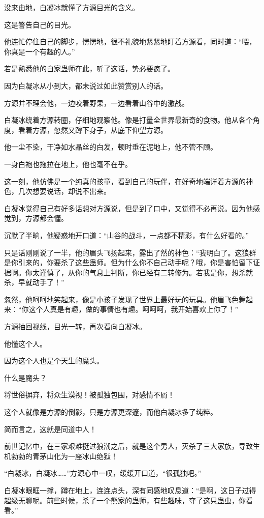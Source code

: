 \begin{this_body}
没来由地，白凝冰就懂了方源目光的含义。

这是警告自己的目光。

他连忙停住自己的脚步，愣愣地，很不礼貌地紧紧地盯着方源看，同时道：“喂，你真是一个有趣的人。”

若是熟悉他的白家蛊师在此，听了这话，势必要疯了。

因为白凝冰从小到大，都未说过如此赞赏别人的话。

方源并不理会他，一边咬着野果，一边看着山谷中的激战。

白凝冰绕着方源转圈，仔细地观察他。像是打量全世界最新奇的食物。他从各个角度，看着方源，忽然又蹲下身子，从底下仰望方源。

他一尘不染，干净如水晶丝的白发，顿时垂在泥地上，他不管不顾。

一身白袍也拖拉在地上，他也毫不在乎。

这一刻，他仿佛是一个纯真的孩童，看到自己的玩伴，在好奇地端详着方源的神色，几次想要说话，却说不出来。

白凝冰觉得自己有好多话想对方源说，但是到了口中，又觉得不必再说。因为他感觉到，方源都会懂。

沉默了半晌，他疑惑地开口道：“山谷的战斗，一点都不精彩，有什么好看的。”

只是话刚刚说了一半，他的眉头飞扬起来，露出了然的神色：“我明白了。这狼群是你引来的，你要杀了这些蛊师。但为什么你不自己动手呢？哦，你是害怕留下证据啊。你太谨慎了，从你的气息上判断，你已经有二转修为。若我是你，想杀就杀，早就动手了！”

忽然，他呵呵地笑起来，像是小孩子发现了世界上最好玩的玩具。他眉飞色舞起来：“你这个人真是有趣，做的事情也有趣。呵呵呵，我开始喜欢上你了！”

方源抽回视线，目光一转，再次看向白凝冰。

他懂这个人。

因为这个人也是个天生的魔头。

什么是魔头？

将世俗摒弃，将众生漠视！被孤独包围，对感情不屑！

这个人就像是方源的倒影，只是方源更深邃，而他白凝冰多了纯粹。

简而言之，这就是同道中人！

前世记忆中，在三家艰难挺过狼潮之后，就是这个男人，灭杀了三大家族，导致生机勃勃的青茅山化为一座冰山绝狱！

“白凝冰，白凝冰……”方源心中一叹，缓缓开口道，“很孤独吧。”

白凝冰眼眶一撑，蹲在地上，连连点头，深有同感地叹息道：“是啊，这日子过得超级无聊呢。前些时候，杀了一个熊家的蛊师，有些趣味，夺了这只蛊虫，你看看。”


\end{this_body}
